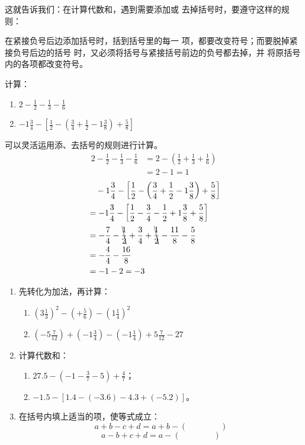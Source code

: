 这就告诉我们：在计算代数和，遇到需要添加或
去掉括号时，要遵守这样的规则：

\begin{blk}{}
	在紧接负号后边添加括号时，括到括号里的每一
	项，都要改变符号；而要脱掉紧接负号后边的括号
	时，又必须将括号与紧接括号前边的负号都去掉，并
	将原括号内的各项都改变符号。
\end{blk}



\begin{example}
	计算：
	\begin{enumerate}
		\item $2-\frac{1}{2}-\frac{1}{3}-\frac{1}{6}$
		\item $-1\frac{3}{4}-\left[\frac{1}{2}-\left(\frac{3}{4}+\frac{1}{2}-1\frac{3}{8}\right)+\frac{5}{8}\right]$
	\end{enumerate}
\end{example}

\begin{solution}
	可以灵活运用添、去括号的规则进行计算。
	\[ \begin{split}
	2-\frac{1}{2}-\frac{1}{3}-\frac{1}{6}&=2-\left(\frac{1}{2}+\frac{1}{3}+\frac{1}{6}\right)\\
	&=2-1=1
	\end{split}  \]
	\[ \begin{split}
	&\quad -1\frac{3}{4}-\left[\frac{1}{2}-\left(\frac{3}{4}+\frac{1}{2}-1\frac{3}{8}\right)+\frac{5}{8}\right]\\
	&=-1\frac{3}{4}-\left[\frac{1}{2}-\frac{3}{4}-\frac{1}{2}+1\frac{3}{8}+\frac{5}{8}\right]\\
	&=-\frac{7}{4}-\bcancel{\frac{1}{2}}+\frac{3}{4}+\bcancel{\frac{1}{2}}-\frac{11}{8}-\frac{5}{8}\\
	&=-\frac{4}{4}-\frac{16}{8}\\
	&=-1-2=-3
	\end{split}  \]
\end{solution}

\begin{ex}
	\begin{enumerate}
		\item 先转化为加法，再计算：
		\begin{enumerate}
			\item $\left(3\frac{1}{3}\right)^2-\left(+\frac{5}{6}\right)-\left(1\frac{1}{4}\right)^2$
			\item $\left(-5\frac{7}{12}\right)+\left(-1\frac{3}{4}\right)-\left(-1\frac{1}{4}\right)+5\frac{7}{12}-27$
		\end{enumerate}
		\item 计算代数和：
		\begin{enumerate}
			\item $27.5-\left(-1-\frac{3}{7}-5\right)+\frac{4}{7}$；
			\item $-1.5-[1.4-(-3.6)-4.3+(-5.2)]$。
		\end{enumerate}
		\item 在括号内填上适当的项，使等式成立：
		\[a+b-c+d=a+b-(\qquad \qquad )\]
		\[ a-b+c+d=a-(\qquad \qquad )     \]
	\end{enumerate}    
\end{ex}


